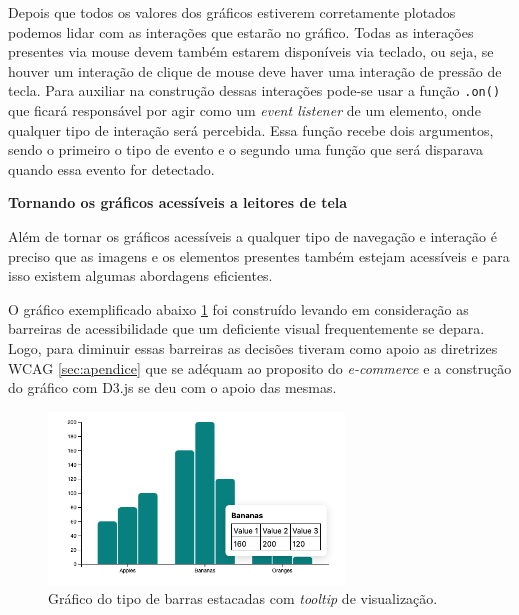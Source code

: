 Depois que todos os valores dos gráficos estiverem corretamente plotados podemos lidar com as interações que estarão no gráfico. Todas as interações presentes via mouse devem também estarem disponíveis via teclado, ou seja, se houver um interação de clique de mouse deve haver uma interação de pressão de tecla. Para auxiliar na construção dessas interações pode-se usar a função \lstinline{.on()} que ficará responsável por agir como um \textit{event listener} de um elemento, onde qualquer tipo de interação será percebida. Essa função recebe dois argumentos, sendo o primeiro o tipo de evento e o segundo uma função que será disparava quando essa evento for detectado. 


\vspace{1cm}
{\centerline{\textbf{Tornando os gráficos acessíveis a leitores de tela}}}
{Além de tornar os gráficos acessíveis a qualquer tipo de navegação e interação é preciso que as imagens e os elementos presentes também estejam acessíveis e para isso existem algumas abordagens eficientes.  

O gráfico exemplificado abaixo \ref{fig:grafico-d3} foi construído levando em consideração as barreiras de acessibilidade que um deficiente visual frequentemente se depara. Logo, para diminuir essas barreiras as decisões tiveram como apoio as diretrizes WCAG \ref{sec:apendice} que se adéquam ao proposito do \textit{e-commerce} e a construção do gráfico com D3.js \cite{D3} se deu com o apoio das mesmas. 


\begin{figure}[ht]
  	\center
    \includegraphics[width=0.7\textwidth]{images/barchart-tooltip.png}
    \caption{Gráfico do tipo de barras estacadas com \textit{tooltip} de visualização.}
    \label{fig:grafico-d3}
\end{figure} 

}


